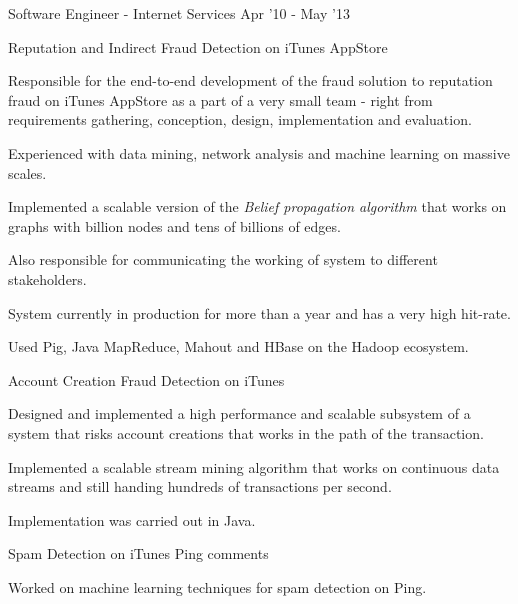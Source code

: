 \documentclass[10pt]{article}
\newenvironment{outerlist}[1][\enskip\textbullet]%
        {\begin{itemize}[#1]}{\end{itemize}%
         \vspace{-0.6\baselineskip}}
\newenvironment{innerlist}[1][\enskip\textbullet]%
        {\begin{compactitem}[#1]}{\end{compactitem}}
\begin{document}
\begin{outerlist}
\item[] Software Engineer - Internet Services \hfill{Apr '10 - May '13}

	\begin{outerlist}
		\item[] Reputation and Indirect Fraud Detection on iTunes AppStore %
		\begin{innerlist}
			\item Responsible for the end-to-end development of the fraud solution to reputation fraud on iTunes AppStore as a part of a very small team - right from requirements gathering, conception, design, implementation and evaluation. 
			\item Experienced with data mining, network analysis and machine learning on massive scales.
			\item Implemented a scalable version of the \emph{Belief propagation algorithm} that works on graphs with billion nodes and tens of billions of edges.
			\item Also responsible for communicating the working of system to different stakeholders.
			\item System currently in production for more than a year and has a very high hit-rate.
			\item Used Pig, Java MapReduce, Mahout and HBase on the Hadoop ecosystem.
		\end{innerlist}
	\end{outerlist}
	
	\begin{outerlist}
		\item[] Account Creation Fraud Detection on iTunes %
		\begin{innerlist}
			\item Designed and implemented a high performance and scalable subsystem of a system that risks account creations that works in the path of the transaction.
			\item Implemented a scalable stream mining algorithm that works on continuous data streams and still handing hundreds of transactions per second.
			\item Implementation was carried out in Java.
		\end{innerlist}
	\end{outerlist}

	\begin{outerlist}
	\item[] Spam Detection on iTunes Ping comments %
	        \begin{innerlist}
	        \item Worked on machine learning techniques for spam detection on Ping.
	        
	        \end{innerlist}
	\end{outerlist}
	
\end{outerlist}
\end{document}
